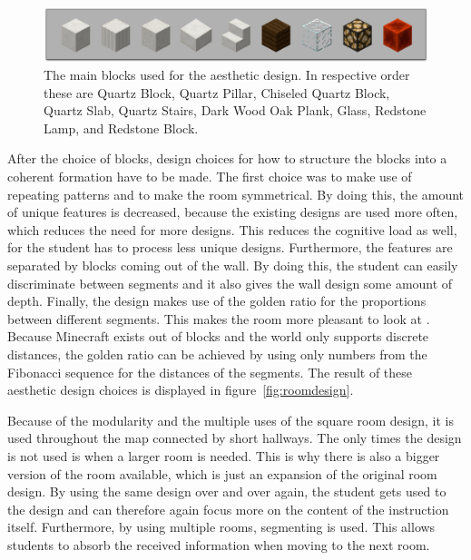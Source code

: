 \documentclass[11pt,twoside]{report} %
\begin{document}
\begin{figure}[h]
\centering
\includegraphics[width=\textwidth]{blocks}
\caption{The main blocks used for the aesthetic design. In respective order these are Quartz Block, Quartz Pillar, Chiseled Quartz Block, Quartz Slab, Quartz Stairs, Dark Wood Oak Plank, Glass, Redstone Lamp, and Redstone Block. \label{fig:blocks}}
\end{figure}

After the choice of blocks, design choices for how to structure the blocks into a coherent formation have to be made. The first choice was to make use of repeating patterns and to make the room symmetrical. By doing this, the amount of unique features is decreased, because the existing designs are used more often, which reduces the need for more designs. This reduces the cognitive load as well, for the student has to process less unique designs. Furthermore, the features are separated by blocks coming out of the wall. By doing this, the student can easily discriminate between segments and it also gives the wall design some amount of depth. Finally, the design makes use of the golden ratio for the proportions between different segments. This makes the room more pleasant to look at \cite{livio}. Because Minecraft exists out of blocks and the world only supports discrete distances, the golden ratio can be achieved by using only numbers from the Fibonacci sequence for the distances of the segments. The result of these aesthetic design choices is displayed in figure~\ref{fig:roomdesign}.

Because of the modularity and the multiple uses of the square room design, it is used throughout the map connected by short hallways. The only times the design is not used is when a larger room is needed. This is why there is also a bigger version of the room available, which is just an expansion of the original room design. By using the same design over and over again, the student gets used to the design and can therefore again focus more on the content of the instruction itself. Furthermore, by using multiple rooms, segmenting is used. This allows students to absorb the received information when moving to the next room.
\end{document}
